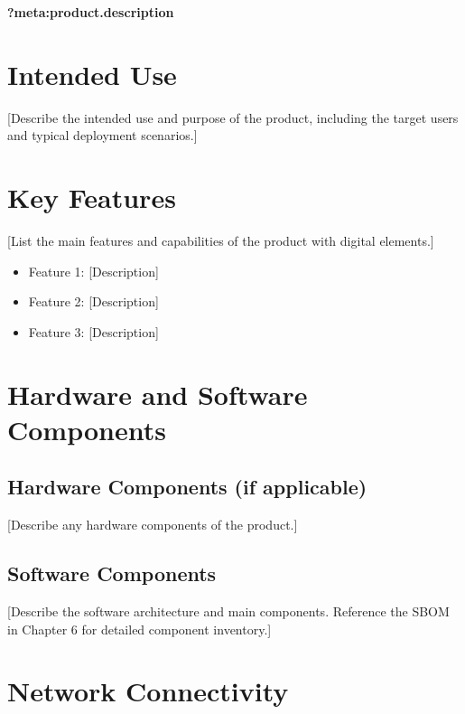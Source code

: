 \documentclass[
  11 pt,
  a4paper,
  table]{report}
\providecommand{\tightlist}{%
  \setlength{\itemsep}{0pt}\setlength{\parskip}{0pt}}\usepackage{longtable,booktabs,array}
\begin{document}
\textbf{?meta:product.description}

\section{Intended Use}\label{intended-use}

{[}Describe the intended use and purpose of the product, including the
target users and typical deployment scenarios.{]}

\section{Key Features}\label{key-features}

{[}List the main features and capabilities of the product with digital
elements.{]}

\begin{itemize}
\tightlist
\item
  Feature 1: {[}Description{]}
\item
  Feature 2: {[}Description{]}
\item
  Feature 3: {[}Description{]}
\end{itemize}

\section{Hardware and Software
Components}\label{hardware-and-software-components}

\subsection{Hardware Components (if
applicable)}\label{hardware-components-if-applicable}

{[}Describe any hardware components of the product.{]}

\subsection{Software Components}\label{software-components}

{[}Describe the software architecture and main components. Reference the
SBOM in Chapter 6 for detailed component inventory.{]}

\section{Network Connectivity}\label{network-connectivity}
\end{document}
